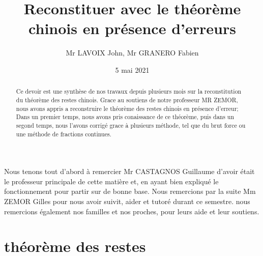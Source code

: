 \documentclass[a4paper, 11pt]{article}
\begin{document}
\title{Reconstituer avec le théorème chinois en présence d’erreurs}
\author{Mr LAVOIX John, Mr GRANERO Fabien }
\date{5 mai 2021}



\begin{abstract}

    Ce devoir est une synthèse de nos travaux depuis plusieurs mois sur la reconstitution du théorème des restes chinois. 
Grace au soutiens de notre professeur MR ZEMOR, nous avons appris a reconstruire le théorème des restes chinois en présence d'erreur;
Dans un premier temps, nous avons pris conaissance de ce théorème, puis dans un segond temps, nous l'avons corrigé grace à plusieurs méthode, 
tel que du brut force ou une méthode de fractions continues.

\end{abstract}

\newpage

\tableofcontents

\newpage
\begin{flushleft}
    Nous tenons tout d'abord à remercier Mr CASTAGNOS Guillaume d'avoir était le professeur principale de cette matière et,
en ayant bien expliqué le fonctionnement pour partir sur de bonne base. Nous remercions par la suite Mm ZEMOR Gilles pour nous 
avoir suivit, aider et tutoré durant ce semestre.
\newline 
nous remercions également nos familles et nos proches, pour leurs aide et leur soutiens.
\end{flushleft}

\newpage

\section{théorème des restes}
\end{document}
